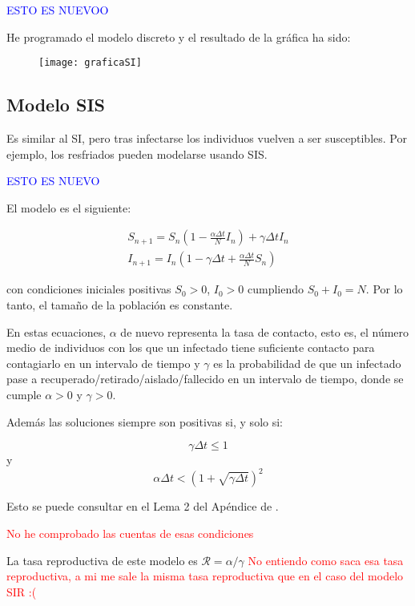 \textcolor{blue}{ESTO ES NUEVOO}

He programado el modelo discreto y el resultado de la gráfica ha sido:

\begin{figure}[H]
\begin{center}
\texttt{[image: graficaSI]}
\end{center}
\end{figure}


\subsection{Modelo SIS}
Es similar al SI, pero tras infectarse los individuos vuelven a ser susceptibles.
Por ejemplo, los resfriados pueden modelarse usando SIS.

\textcolor{blue}{ESTO ES NUEVO}

El modelo es el siguiente:

\begin{equation}
\label{eqn: modelo_SIS}
\begin{aligned}
S_{n+1} = S_n \left(1-\frac{\alpha\Delta t}{N} I_n \right) + \gamma \Delta t I_n \\
I_{n+1} = I_n \left( 1-\gamma \Delta t + \frac{\alpha\Delta t}{N} S_n \right)
\end{aligned}
\end{equation}

con condiciones iniciales positivas $S_0>0$, $I_0>0$ cumpliendo $S_0+I_0=N$. Por lo tanto, el tamaño de la población es constante.

En estas ecuaciones, $\alpha$ de nuevo representa la tasa de contacto, esto es, el número medio de individuos con los que un infectado tiene suficiente contacto para contagiarlo en un intervalo de tiempo y $\gamma$ es la probabilidad de que un infectado pase a recuperado/retirado/aislado/fallecido en un intervalo de tiempo, donde se cumple $\alpha >0$ y $\gamma >0$.

Además las soluciones siempre son positivas si, y solo si:

$$\gamma \Delta t \leq 1 $$ y $$\alpha\Delta t< \left( 1+\sqrt{\gamma \Delta t} \right)^2$$

Esto se puede consultar en el Lema 2 del Apéndice de \cite{allenDiscretetimeSISIR1994}.

\textcolor{red}{No he comprobado las cuentas de esas condiciones}

La tasa reproductiva de este modelo es $\mathcal{R}=\alpha /\gamma$ \textcolor{red}{No entiendo como saca esa tasa reproductiva, a mi me sale la misma tasa reproductiva que en el caso del modelo SIR :(}

